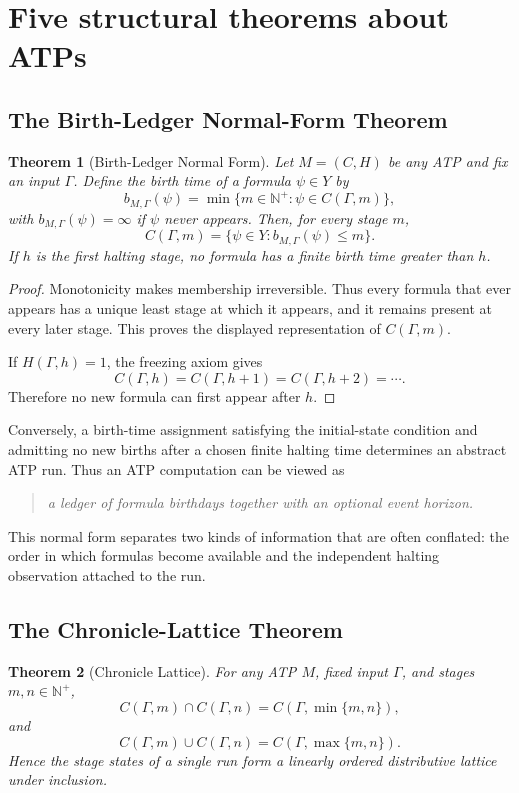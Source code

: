 \documentclass[11pt,letterpaper]{article}
\theoremstyle{named}
\newtheorem{theorem}{Theorem}[section]
\begin{document}
\section{Five structural theorems about ATPs}

\subsection{The Birth-Ledger Normal-Form Theorem}

\begin{theorem}[Birth-Ledger Normal Form]
Let $M=(C,H)$ be any ATP and fix an input $\Gamma$. Define the birth time of a formula $\psi\in Y$ by
\[
b_{M,\Gamma}(\psi)
=
\min\{m\in\mathbb N^+:\psi\in C(\Gamma,m)\},
\]
with $b_{M,\Gamma}(\psi)=\infty$ if $\psi$ never appears. Then, for every stage $m$,
\[
C(\Gamma,m)
=
\{\psi\in Y:b_{M,\Gamma}(\psi)\le m\}.
\]
If $h$ is the first halting stage, no formula has a finite birth time greater than $h$.
\end{theorem}

\begin{proof}
Monotonicity makes membership irreversible. Thus every formula that ever appears has a unique least stage at which it appears, and it remains present at every later stage. This proves the displayed representation of $C(\Gamma,m)$.

If $H(\Gamma,h)=1$, the freezing axiom gives
\[
C(\Gamma,h)=C(\Gamma,h+1)=C(\Gamma,h+2)=\cdots.
\]
Therefore no new formula can first appear after $h$.
\end{proof}

Conversely, a birth-time assignment satisfying the initial-state condition and admitting no new births after a chosen finite halting time determines an abstract ATP run. Thus an ATP computation can be viewed as

\begin{quote}
\emph{a ledger of formula birthdays together with an optional event horizon.}
\end{quote}

This normal form separates two kinds of information that are often conflated: the order in which formulas become available and the independent halting observation attached to the run.

\subsection{The Chronicle-Lattice Theorem}

\begin{theorem}[Chronicle Lattice]
For any ATP $M$, fixed input $\Gamma$, and stages $m,n\in\mathbb N^+$,
\[
C(\Gamma,m)\cap C(\Gamma,n)
=
C(\Gamma,\min\{m,n\}),
\]
and
\[
C(\Gamma,m)\cup C(\Gamma,n)
=
C(\Gamma,\max\{m,n\}).
\]
Hence the stage states of a single run form a linearly ordered distributive lattice under inclusion.
\end{theorem}
\end{document}
